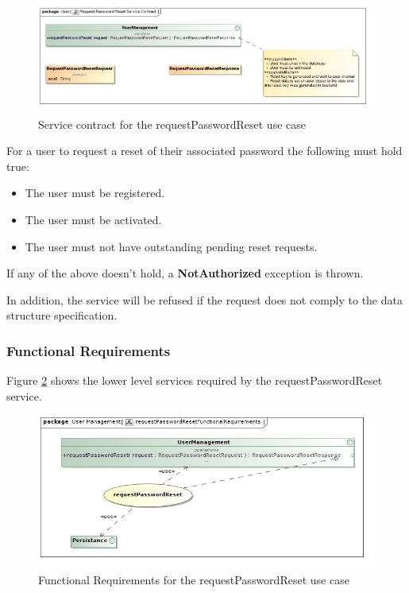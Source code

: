 \begin{figure}[H]
  \begin{center}
  \includegraphics[scale=0.55]{../Diagrams and Charts/Users/Request Password Reset Service Contract.jpg}
  \caption{Service contract for the requestPasswordReset use case}
  \end{center}
  \label{fig:requestPasswordResetServicesContract}
\end{figure}

For a user to request a reset of their associated password the following must hold true:
\begin{itemize}
	\item The user must be registered.
	\item The user must be activated.
	\item The user must not have outstanding pending reset requests.
\end{itemize}

If any of the above doesn't hold, a \textbf{NotAuthorized} exception is thrown.

In addition, the service will be refused if the request does not comply to the data structure specification.

\subsubsection{Functional Requirements}
Figure \ref{fig:requestPasswordResetFR} shows the lower level services required by the requestPasswordReset service.

\begin{figure}[H]
	\begin{center}
		\includegraphics[scale=0.55]{../Diagrams and Charts/Users/requestPasswordResetFunctionalRequirements.jpg}
		\caption{Functional Requirements for the requestPasswordReset use case}
		\label{fig:requestPasswordResetFR}
	\end{center}
\end{figure}

